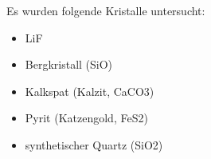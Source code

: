 Es wurden folgende Kristalle untersucht:
\begin{itemize}
    \item
        LiF
    \item
        Bergkristall (SiO)
    \item
        Kalkspat (Kalzit, CaCO3)
    \item
        Pyrit (Katzengold, FeS2)
    \item
        synthetischer Quartz (SiO2)
\end{itemize}

